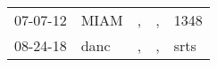 \begin{supertabular}{lllll}
 07-07-12 &  MIAM &  , &  , &  1348 \\
 08-24-18 &  danc &  , &  , &  srts \\
\end{supertabular}

